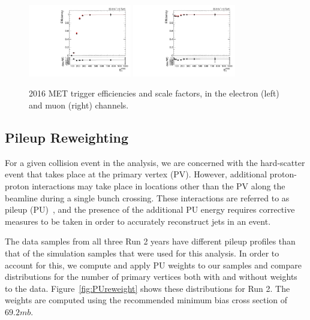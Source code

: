 \begin{figure}[htbp]
  \centering
  \includegraphics[width=0.4\textwidth]{fig/eventSelection/TriggerEff_MET_eleChannel_2016.pdf}
  \includegraphics[width=0.4\textwidth]{fig/eventSelection/TriggerEff_MET_muChannel_2016.pdf}
  \caption{
    2016 MET trigger efficiencies and scale factors, in the electron (left) and muon (right) channels.
  }
  \label{fig:mettrigeff2016}
\end{figure}

\subsection{Pileup Reweighting}

For a given collision event in the analysis, we are concerned with the hard-scatter event that takes place at the primary vertex (PV).
However, additional proton-proton interactions may take place in locations other than the PV along the beamline during a single bunch crossing.
These interactions are referred to as pileup (PU)~\cite{Perloff_2012}, and the presence of the additional PU energy requires corrective measures to be taken in order to accurately reconstruct jets in an event.

The data samples from all three Run 2 years have different pileup profiles than that of the simulation samples that were used for this analysis.
In order to account for this, we compute and apply PU weights to our samples and compare distributions for the number of primary vertices both with and without weights to the data.
Figure~\ref{fig:PUreweight} shows these distributions for Run 2.
The weights are computed using the recommended minimum bias cross section of $69.2\unit{mb}$. %

